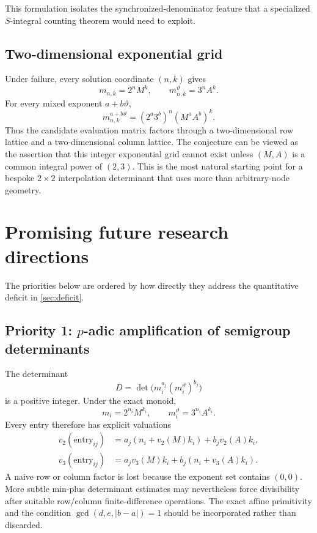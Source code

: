 \documentclass[11pt,oneside]{article}
\theoremstyle{definition}
\theoremstyle{remark}
\newcommand{\thetaq}{\vartheta}
\newcommand{\vpp}[2]{v_{#1}\!\left(#2\right)}
\begin{document}
This formulation isolates the synchronized-denominator feature that a specialized
$S$-integral counting theorem would need to exploit.

\subsection{Two-dimensional exponential grid}

Under failure, every solution coordinate $(n,k)$ gives
\[
 m_{n,k}=2^nM^k,
 \qquad
 m_{n,k}^{\thetaq}=3^nA^k.
\]
For every mixed exponent $a+b\thetaq$,
\begin{equation}
 m_{n,k}^{a+b\thetaq}
 =(2^a3^b)^n(M^aA^b)^k.
 \label{eq:two-dimensional-grid}
\end{equation}
Thus the candidate evaluation matrix factors through a two-dimensional row lattice and a
two-dimensional column lattice.  The conjecture can be viewed as the assertion that this
integer exponential grid cannot exist unless $(M,A)$ is a common integral power of $(2,3)$.
This is the most natural starting point for a bespoke $2\times2$ interpolation determinant
that uses more than arbitrary-node geometry.

\section{Promising future research directions}
\label{sec:future}

The priorities below are ordered by how directly they address the quantitative deficit in
\cref{sec:deficit}.

\subsection{Priority 1: $p$-adic amplification of semigroup determinants}

The determinant
\[
 D=\det\bigl(m_i^{a_j}(m_i^{\thetaq})^{b_j}\bigr)
\]
is a positive integer.  Under the exact monoid,
\[
 m_i=2^{n_i}M^{k_i},
 \qquad
 m_i^{\thetaq}=3^{n_i}A^{k_i}.
\]
Every entry therefore has explicit valuations
\begin{align*}
 \vpp{2}{\text{entry}_{ij}}
 &=a_j(n_i+\vpp{2}{M}k_i)+b_j\vpp{2}{A}k_i,\\
 \vpp{3}{\text{entry}_{ij}}
 &=a_j\vpp{3}{M}k_i+b_j(n_i+\vpp{3}{A}k_i).
\end{align*}
A naive row or column factor is lost because the exponent set contains $(0,0)$.  More subtle
min-plus determinant estimates may nevertheless force divisibility after suitable row/column
finite-difference operations.  The exact affine primitivity and the condition
$\gcd(d,e,|b-a|)=1$ should be incorporated rather than discarded.
\end{document}
